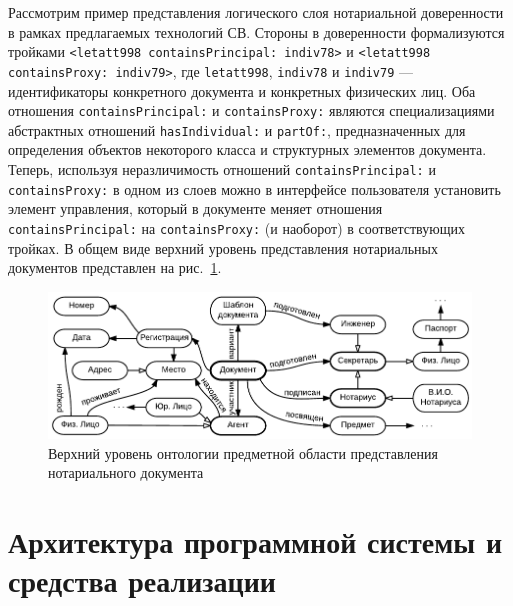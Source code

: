 \documentclass[utf8]{../IncArticle}
\begin{document}
Рассмотрим пример представления логического слоя нотариальной доверенности
в рамках предлагаемых технологий СВ.  Стороны в доверенности
формализуются тройками \texttt{<letatt998 con\-ta\-insPrin\-ci\-pal: indiv78>}
и \texttt{<letatt998 con\-ta\-insPro\-xy: indiv79>}, где \texttt{letatt998},
\texttt{indiv78} и \texttt{indiv79} --- идентификаторы конкретного
документа и конкретных физических лиц.  Оба отношения
\texttt{con\-ta\-insPrin\-ci\-pal:} и \texttt{containsProxy:} являются
специализациями абстрактных отношений \texttt{hasIndividual:} и
\texttt{partOf:}, предназначенных для определения объектов некоторого
класса и структурных элементов документа.  Теперь, используя
неразличимость отношений \texttt{containsPrincipal:} и
\texttt{containsProxy:} в одном из слоев можно в интерфейсе
пользователя установить элемент управления, который в документе меняет
отношения \texttt{containsPrincipal:} на \texttt{containsProxy:} (и
наоборот) в соответствующих тройках.  В общем виде верхний уровень представления
нотариальных документов представлен на рис.~\ref{notaryontology}.
\begin{figure}[!t]
\centering
\includegraphics[width=0.8\linewidth]{DocumentOntology-ru.pdf}
\caption{Верхний уровень онтологии предметной области представления
  нотариального документа}
\label{notaryontology}
\end{figure}


\section{Архитектура программной системы и средства реализации}
\end{document}
